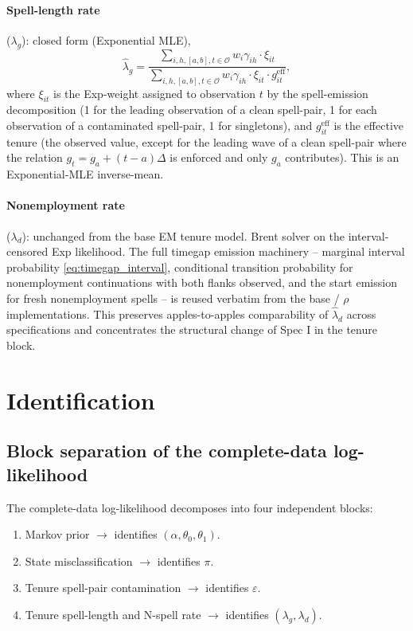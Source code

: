 \documentclass[12pt]{article}
\begin{document}
\paragraph{Spell-length rate} (\(\lambda_g\)): closed form (Exponential MLE),
\begin{equation}
\hat\lambda_g = \frac{\sum_{i,h,[a,b],t\in\mathcal{O}} w_i \gamma_{ih} \cdot \xi_{it}}{\sum_{i,h,[a,b],t\in\mathcal{O}} w_i \gamma_{ih} \cdot \xi_{it} \cdot g_{it}^{\mathrm{eff}}},
\label{eq:lambda_g_mstep}
\end{equation}
where \(\xi_{it}\) is the Exp-weight assigned to observation \(t\) by the
spell-emission decomposition (1 for the leading observation of a clean
spell-pair, 1 for each observation of a contaminated spell-pair, 1 for
singletons), and \(g_{it}^{\mathrm{eff}}\) is the effective tenure (the
observed value, except for the leading wave of a clean spell-pair where
the relation \(g_t = g_a + (t-a)\Delta\) is enforced and only \(g_a\)
contributes). This is an Exponential-MLE inverse-mean.

\paragraph{Nonemployment rate} (\(\lambda_d\)): unchanged from the base EM tenure
model. Brent solver on the interval-censored Exp likelihood. The full
timegap emission machinery -- marginal interval probability
\eqref{eq:timegap_interval}, conditional transition probability for
nonemployment continuations with both flanks observed, and the start
emission for fresh nonemployment spells -- is reused verbatim from the
base / \(\rho\) implementations. This preserves apples-to-apples
comparability of \(\hat\lambda_d\) across specifications and concentrates
the structural change of Spec I in the tenure block.

\section{Identification}
\label{sec:identification_eps}

\subsection{Block separation of the complete-data log-likelihood}

The complete-data log-likelihood decomposes into four independent blocks:

\begin{enumerate}
\item Markov prior \(\rightarrow\) identifies \((\alpha,\theta_0,\theta_1)\).
\item State misclassification \(\rightarrow\) identifies \(\pi\).
\item Tenure spell-pair contamination \(\rightarrow\) identifies \(\varepsilon\).
\item Tenure spell-length and N-spell rate \(\rightarrow\) identifies
  \((\lambda_g, \lambda_d)\).
\end{enumerate}
\end{document}
